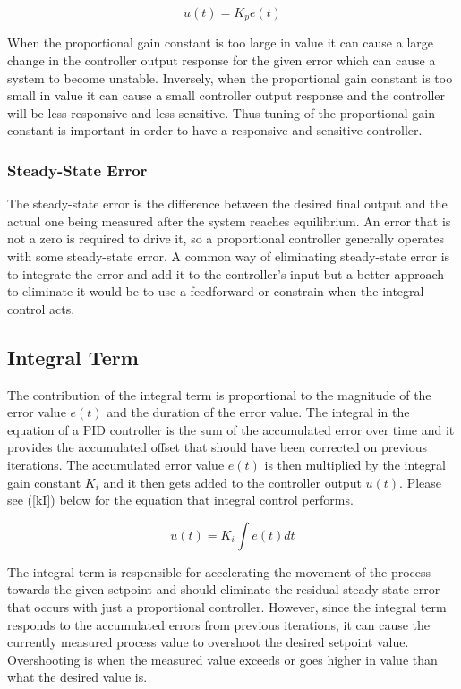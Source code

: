 \documentclass[10pt,conference]{IEEEtran}
\begin{document}
\begin{equation}
    \displaystyle {u(t)=K_pe(t)}\label{kP}
\end{equation}

When the proportional gain constant is too large in value it can cause a large change in the controller
output response for the given error which can cause a system to become unstable. Inversely, when the
proportional gain  constant is too small in value it can cause a small controller output response and
the controller will be less responsive and less sensitive. Thus tuning of the proportional gain
constant is important in order to have a responsive and sensitive controller.

\subsubsection{Steady-State Error}

The steady-state error is the difference between the desired final output and the actual one being
measured after the system reaches equilibrium. An error that is not a zero is required to drive
it, so a proportional controller generally operates with some steady-state error. A common way
of eliminating steady-state error is to integrate the error and add it to the controller's input
but a better approach to eliminate it would be to use a feedforward or constrain when the
integral control acts.

\subsection{Integral Term}

The contribution of the integral term is proportional to the magnitude of the error value \(e(t)\) and
the duration of the error value. The integral in the equation of a PID controller is the sum of the
accumulated error over time and it provides the accumulated offset that should have been corrected on
previous iterations. The accumulated error value \(e(t)\) is then multiplied by the integral gain
constant \(K_i\) and it then gets added to the controller output \(u(t)\). Please see (\ref{kI}) below for
the equation that integral control performs.

\begin{equation}
    \displaystyle {u(t)=K_i\int e(t)dt}\label{kI}
\end{equation}

The integral term is responsible for accelerating the movement of the process towards the given
setpoint and should eliminate the residual steady-state error that occurs with just a proportional
controller. However, since the integral term responds to the accumulated errors from previous
iterations, it can cause the currently measured process value to overshoot the desired setpoint
value. Overshooting is when the measured value exceeds or goes higher in value than what the
desired value is.
\end{document}
